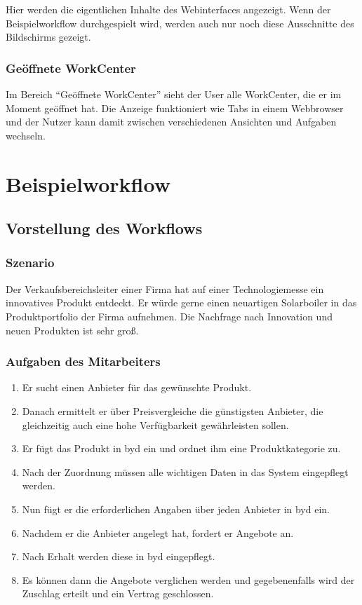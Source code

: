 Hier werden die eigentlichen Inhalte des Webinterfaces angezeigt. Wenn der Beispielworkflow durchgespielt wird, werden auch nur noch diese Ausschnitte des Bildschirms gezeigt.

\subsubsection{Geöffnete WorkCenter}

Im Bereich "`Geöffnete WorkCenter"' sieht der User alle WorkCenter, die er im Moment geöffnet hat. Die Anzeige funktioniert wie Tabs in einem Webbrowser und der Nutzer kann damit zwischen verschiedenen Ansichten und Aufgaben wechseln.

\section{Beispielworkflow}

\subsection{Vorstellung des Workflows}
\label{sec:byd-bsp-vorstellung}

\subsubsection{Szenario}

Der Verkaufsbereichsleiter einer Firma hat auf einer Technologiemesse ein innovatives Produkt entdeckt. Er würde gerne einen neuartigen Solarboiler in das Produktportfolio der Firma aufnehmen. Die Nachfrage nach Innovation und neuen Produkten ist sehr groß.

\subsubsection{Aufgaben des Mitarbeiters}

\begin{enumerate}
 \item Er sucht einen Anbieter für das gewünschte Produkt.
 \item Danach ermittelt er über Preisvergleiche die günstigsten Anbieter, die gleichzeitig auch eine hohe Verfügbarkeit gewährleisten sollen.
 \item Er fügt das Produkt in \gls{byd} ein und ordnet ihm eine Produktkategorie zu.
 \item Nach der Zuordnung müssen alle wichtigen Daten in das System eingepflegt werden.
 \item Nun fügt er die erforderlichen Angaben über jeden Anbieter in \gls{byd} ein.
 \item Nachdem er die Anbieter angelegt hat, fordert er Angebote an.
 \item Nach Erhalt werden diese in \gls{byd} eingepflegt.
 \item Es können dann die Angebote verglichen werden und gegebenenfalls wird der Zuschlag erteilt und ein Vertrag geschlossen.
 \end{enumerate}


